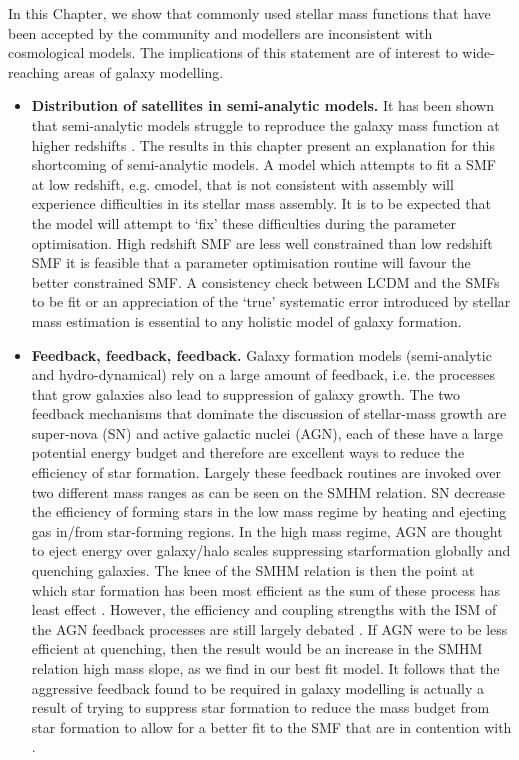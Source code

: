 In this Chapter, we show that commonly used stellar mass functions that have been accepted by the community and modellers are inconsistent with \LCDM cosmological models. The implications of this statement are of interest to wide-reaching areas of galaxy modelling. 
\begin{itemize}
    \item \textbf{Distribution of satellites in semi-analytic models.} It has been shown that semi-analytic models struggle to reproduce the galaxy mass function at higher redshifts \citep[e.g.][]{Asquith2018CosmicModels}. 
    The results in this chapter present an explanation for this shortcoming of semi-analytic models. A model which attempts to fit a SMF at low redshift, e.g. cmodel, that is not consistent with \LCDM assembly will experience difficulties in its stellar mass assembly. It is to be expected that the model will attempt to `fix' these difficulties during the parameter optimisation. High redshift SMF are less well constrained than low redshift SMF it is feasible that a parameter optimisation routine will favour the better constrained SMF. A consistency check between LCDM and the SMFs to be fit or an appreciation of the `true' systematic error introduced by stellar mass estimation is essential to any holistic model of galaxy formation.
    \item \textbf{Feedback, feedback, feedback.} Galaxy formation models (semi-analytic and hydro-dynamical) rely on a large amount of feedback, i.e. the processes that grow galaxies also lead to suppression of galaxy growth. The two feedback mechanisms that dominate the discussion of stellar-mass growth are super-nova (SN) and active galactic nuclei (AGN), each of these have a large potential energy budget and therefore are excellent ways to reduce the efficiency of star formation. Largely these feedback routines are invoked over two different mass ranges as can be seen on the SMHM relation. SN decrease the efficiency of forming stars in the low mass regime by heating and ejecting gas in/from star-forming regions. In the high mass regime, AGN are thought to eject energy over galaxy/halo scales suppressing starformation globally and quenching galaxies. The knee of the SMHM relation is then the point at which star formation has been most efficient as the sum of these process has least effect \cite{Shankar2006NewFormation}. However, the efficiency and coupling strengths with the ISM of the AGN feedback processes are still largely debated \cite[e.g.]{Fiore2017AGNGalaxies}. If AGN were to be less efficient at quenching, then the result would be an increase in the SMHM relation high mass slope, as we find in our best fit model. It follows that the aggressive feedback found to be required in galaxy modelling is actually a result of trying to suppress star formation to reduce the mass budget from star formation to allow for a better fit to the SMF that are in contention with \LCDM.

\end{itemize}
